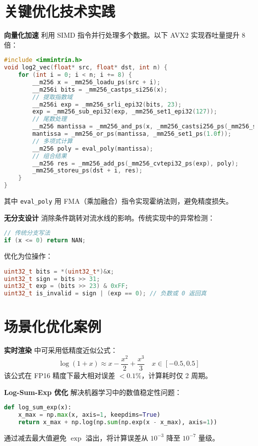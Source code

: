 \chapter{关键优化技术实践}
\textbf{向量化加速} 利用 SIMD 指令并行处理多个数据。以下 AVX2 实现吞吐量提升 8 倍：\par
\begin{lstlisting}[language=cpp]
#include <immintrin.h>
void log2_vec(float* src, float* dst, int n) {
    for (int i = 0; i < n; i += 8) {
        __m256 x = _mm256_loadu_ps(src + i);
        __m256i bits = _mm256_castps_si256(x);
        // 提取指数域
        __m256i exp = _mm256_srli_epi32(bits, 23);
        exp = _mm256_sub_epi32(exp, _mm256_set1_epi32(127));
        // 尾数处理
        __m256 mantissa = _mm256_and_ps(x, _mm256_castsi256_ps(_mm256_set1_epi32(0x7FFFFF)));
        mantissa = _mm256_or_ps(mantissa, _mm256_set1_ps(1.0f));
        // 多项式计算
        __m256 poly = eval_poly(mantissa); 
        // 组合结果
        __m256 res = _mm256_add_ps(_mm256_cvtepi32_ps(exp), poly);
        _mm256_storeu_ps(dst + i, res);
    }
}
\end{lstlisting}
其中 \verb!eval_poly! 用 FMA（乘加融合）指令实现霍纳法则，避免精度损失。\par
\textbf{无分支设计} 消除条件跳转对流水线的影响。传统实现中的异常检测：\par
\begin{lstlisting}[language=c]
// 传统分支写法
if (x <= 0) return NAN; 
\end{lstlisting}
优化为位操作：\par
\begin{lstlisting}[language=c]
uint32_t bits = *(uint32_t*)&x;
uint32_t sign = bits >> 31;
uint32_t exp = (bits >> 23) & 0xFF;
uint32_t is_invalid = sign | (exp == 0); // 负数或 0 返回真
\end{lstlisting}
\chapter{场景化优化案例}
\textbf{实时渲染} 中可采用低精度近似公式：
$$ \log(1+x) \approx x - \frac{x^2}{2} + \frac{x^3}{3} \quad x \in [-0.5, 0.5] $$
该公式在 FP16 精度下最大相对误差 $< 0.1\%$，计算耗时仅 2 周期。\par
\textbf{Log-Sum-Exp 优化} 解决机器学习中的数值稳定性问题：\par
\begin{lstlisting}[language=python]
def log_sum_exp(x):
    x_max = np.max(x, axis=1, keepdims=True)
    return x_max + np.log(np.sum(np.exp(x - x_max), axis=1))
\end{lstlisting}
通过减去最大值避免 $\exp$ 溢出，将计算误差从 $10^{-3}$ 降至 $10^{-7}$ 量级。\par
